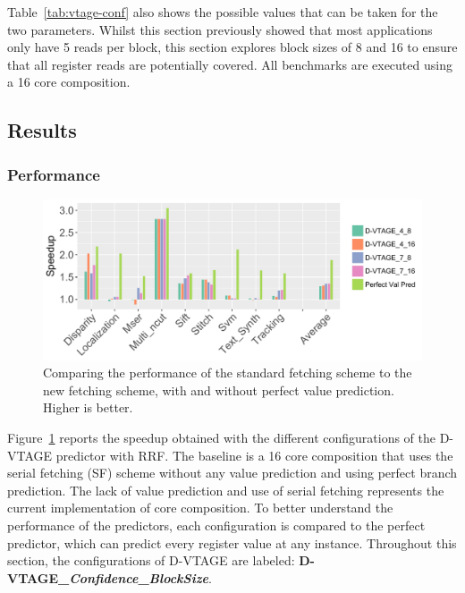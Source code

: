 
Table~\ref{tab:vtage-conf} also shows the possible values that can be taken for the two parameters.
Whilst this section previously showed that most applications only have 5 reads per block, this section explores block sizes of 8 and 16 to ensure that all register reads are potentially covered. 
All benchmarks are executed using a 16 core composition.

\subsection{Results}

\subsubsection{Performance}

\begin{figure}[t]
    \centering
    \includegraphics[width=1\textwidth]{chapter3/graphics/vtage_speed2.pdf}
    \caption{Comparing the performance of the standard fetching scheme to the new fetching scheme, with and without perfect value prediction. Higher is better.}
    \label{fig:vtage_perf}
	\vspace{1em}
\end{figure}

Figure~\ref{fig:vtage_perf} reports the speedup obtained with the different configurations of the D-VTAGE predictor with RRF.
The baseline is a 16 core composition that uses the serial fetching (SF) scheme without any value prediction and using perfect branch prediction.
The lack of value prediction and use of serial fetching represents the current implementation of core composition.
To better understand the performance of the predictors, each configuration is compared to the perfect predictor, which can predict every register value at any instance.
Throughout this section, the configurations of D-VTAGE are labeled: \textbf{D-VTAGE\_\textit{Confidence}\_\textit{BlockSize}}.

